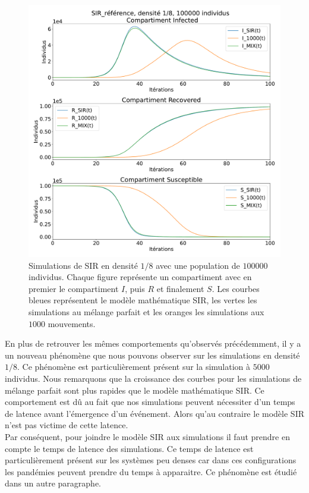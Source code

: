 \begin{figure}[h]
	\centering
	\captionsetup{justification=centering}
	\includegraphics[width=.8\textwidth]{Images/SIR_ref_8_100.pdf}
	\caption[Simulation SIR, densité $1/8$]{Simulations de SIR en densité $1/8$ avec une population de $100000$ individus. Chaque figure représente un compartiment avec en premier le compartiment $I$, puis $R$ et finalement $S$. Les courbes bleues représentent le modèle mathématique SIR, les vertes les simulations au mélange parfait et les oranges les simulations aux $1000$ mouvements.}
\end{figure}

En plus de retrouver les mêmes comportements qu'observés précédemment, il y a un nouveau phénomène que nous pouvons observer sur les simulations en densité $1/8$. Ce phénomène est particulièrement présent sur la simulation à $5000$ individus. Nous remarquons que la croissance des courbes pour les simulations de mélange parfait sont plus rapides que le modèle mathématique SIR. Ce comportement est dû au fait que nos simulations peuvent nécessiter d'un temps de latence avant l'émergence d'un événement. Alors qu'au contraire le modèle SIR n'est pas victime de cette latence.\\

Par conséquent, pour joindre le modèle SIR aux simulations il faut prendre en compte le temps de latence des simulations. Ce temps de latence est particulièrement présent sur les systèmes peu denses car dans ces configurations les pandémies peuvent prendre du temps à apparaitre. Ce phénomène est étudié dans un autre paragraphe.

